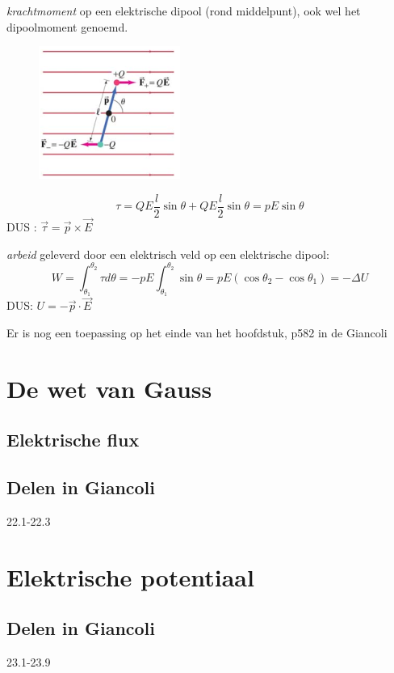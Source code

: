 \documentclass[12pt,a4paper]{article}
\begin{document}
	\textit{krachtmoment} op een elektrische dipool (rond middelpunt), ook wel het dipoolmoment genoemd. 
	\begin{figure}[h]
		\centering
		\includegraphics[width=0.4\linewidth]{dippoolmoment}
		\label{fig:dippoolmoment}
	\end{figure}
	\newpage
	\[\tau = QE\frac{l}{2}\sin\theta + QE\frac{l}{2}\sin\theta = pE\sin\theta\]	
	DUS : \(\vec{\tau} = \vec{p} \times \vec{E}\)
	
	\textit{arbeid} geleverd door een elektrisch veld op een elektrische dipool:
	\[W = \int_{\theta_1}^{\theta_2}\tau d\theta = -pE\int_{\theta_1}^{\theta_2}\sin\theta = pE(\cos\theta_2 - \cos\theta_1) = -\Delta U\]
	DUS: \(U = -\vec{p} \cdot \vec{E}\)
	
	Er is nog een toepassing op het einde van het hoofdstuk, p582 in de Giancoli
	
    \section{De wet van Gauss}
    
    \subsection{Elektrische flux}

    \subsection{Delen in Giancoli}
    22.1-22.3


    \section{Elektrische potentiaal}

    \subsection{Delen in Giancoli}
    23.1-23.9
\end{document}
